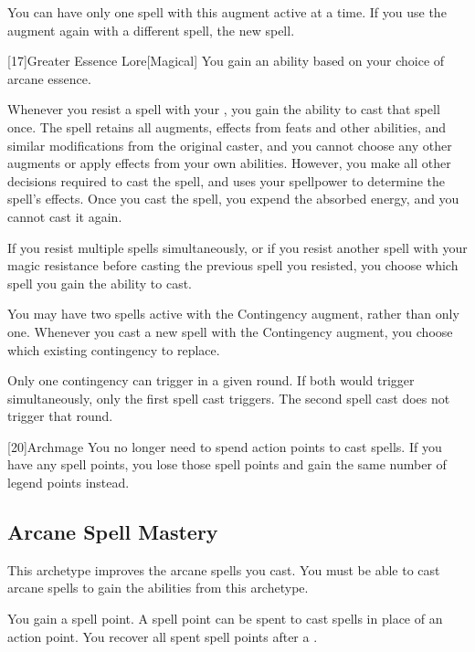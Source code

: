         You can have only one spell with this augment active at a time.
        If you use the augment again with a different spell, the new spell.

        [17]{Greater Essence Lore}[Magical]
        You gain an ability based on your choice of arcane essence.

         Whenever you resist a spell with your , you gain the ability to cast that spell once.
        The spell retains all augments, effects from feats and other abilities, and similar modifications from the original caster, and you cannot choose any other augments or apply effects from your own abilities.
        However, you make all other decisions required to cast the spell, and uses your spellpower to determine the spell's effects.
        Once you cast the spell, you expend the absorbed energy, and you cannot cast it again.

        If you resist multiple spells simultaneously, or if you resist another spell with your magic resistance before casting the previous spell you resisted, you choose which spell you gain the ability to cast.

         You may have two spells active with the Contingency augment, rather than only one.
        Whenever you cast a new spell with the Contingency augment, you choose which existing contingency to replace.

        Only one contingency can trigger in a given round.
        If both would trigger simultaneously, only the first spell cast triggers.
        The second spell cast does not trigger that round.

        [20]{Archmage}
        You no longer need to spend action points to cast spells.
        If you have any spell points, you lose those spell points and gain the same number of legend points instead.

    \subsection{Arcane Spell Mastery}
        This archetype improves the arcane spells you cast.
        You must be able to cast arcane spells to gain the abilities from this archetype.

        You gain a spell point.
        A spell point can be spent to cast spells in place of an action point.
        You recover all spent spell points after a .


